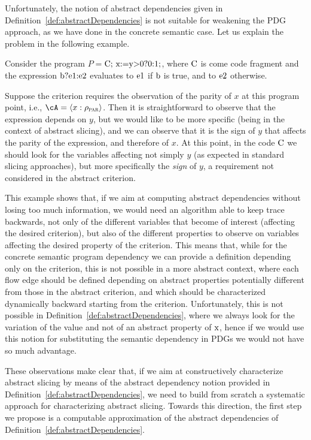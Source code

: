 \documentclass[prodmode,acmtocl]{acmsmall}
\def\prog{\ensuremath{P}\xspace}
\def\uco{\ensuremath{\rho}\xspace}
\def\tuple#1{\langle #1 \rangle}
\newcommand{\0}{\mbox{\bf 0}}
\newcommand{\CODE}[1]{\ensuremath{\mbox{\lstinline!#1!}\xspace}\xspace}
\def\xx{\CODE{x}}
\def\PARDOM{\ensuremath{\uco_{\textsc{par}}}\xspace}
\begin{document}
Unfortunately, the notion of abstract dependencies given in
Definition~\ref{def:abstractDependencies} is not suitable for
weakening the PDG approach, as we have done in the concrete semantic
case.  Let us explain the problem in the following example.
\begin{example}\label{ex:probabs}
  Consider the program $\prog=$\CODE{C; x:=y>0?0:1;}, where \CODE{C}
  is come code fragment and the expression \CODE{b?e1:e2} evaluates to
  \CODE{e1} if \CODE{b} is true, and to \CODE{e2} otherwise.

  \noindent Suppose the criterion requires the observation of the
  parity of $x$ at this program point, i.e., $\cA=\tuple{x:\PARDOM}$.
  Then it is straightforward to observe that the expression depends on
  $y$, but we would like to be more specific (being in the context of
  abstract slicing), and we can observe that it is the sign of $y$
  that affects the parity of the expression, and therefore of $x$. At
  this point, in the code \CODE{C} we should look for the variables
  affecting not simply $y$ (as expected in standard slicing
  approaches), but more specifically the {\em sign} of $y$, a
  requirement not considered in the abstract criterion.
\end{example}

This example shows that, if we aim at computing abstract dependencies
without losing too much information, we would need an algorithm able
to keep trace backwards, not only of the different variables that
become of interest (affecting the desired criterion), but also of the
different properties to observe on variables affecting the desired
property of the criterion. This means that, while for the concrete
semantic program dependency we can provide a definition depending only
on the criterion, this is not possible in a more abstract context,
where each flow edge should be defined depending on abstract
properties potentially different from those in the abstract criterion,
and which should be characterized dynamically backward starting from
the criterion. Unfortunately, this is not possible in
Definition~\ref{def:abstractDependencies}, where we always look for
the variation of the value and not of an abstract property of \xx,
hence if we would use this notion for substituting the semantic
dependency in PDGs we would not have so much advantage.

These observations make clear that, if we aim at constructively
characterize abstract slicing by means of the abstract dependency
notion provided in Definition~\ref{def:abstractDependencies}, we need
to build from scratch a systematic approach for characterizing
abstract slicing. Towards this direction, the first step we propose is
a computable approximation of the abstract dependencies of
Definition~\ref{def:abstractDependencies}.
\end{document}
